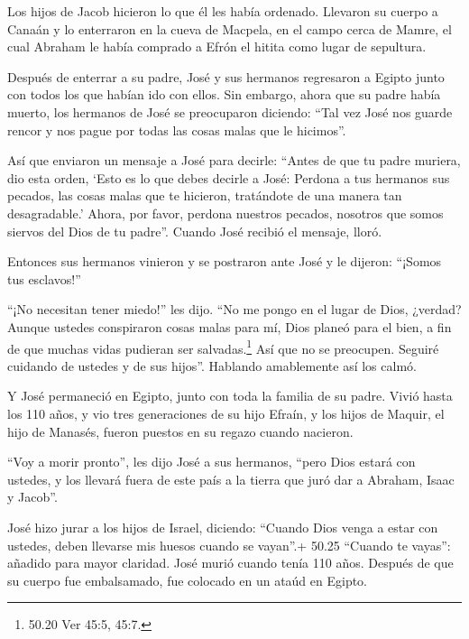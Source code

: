  Los hijos de Jacob hicieron lo que él les había ordenado.
 Llevaron su cuerpo a Canaán y lo enterraron en la cueva de
Macpela, en el campo cerca de Mamre, el cual Abraham le había comprado a
Efrón el hitita como lugar de sepultura.

 Después de enterrar a su padre, José y sus hermanos
regresaron a Egipto junto con todos los que habían ido con ellos.
 Sin embargo, ahora que su padre había muerto, los hermanos
de José se preocuparon diciendo: ``Tal vez José nos guarde rencor y nos
pague por todas las cosas malas que le hicimos''.

 Así que enviaron un mensaje a José para decirle: ``Antes
de que tu padre muriera, dio esta orden,  `Esto es lo que
debes decirle a José: Perdona a tus hermanos sus pecados, las cosas
malas que te hicieron, tratándote de una manera tan desagradable.'
Ahora, por favor, perdona nuestros pecados, nosotros que somos siervos
del Dios de tu padre''. Cuando José recibió el mensaje, lloró.

 Entonces sus hermanos vinieron y se postraron ante José y
le dijeron: ``¡Somos tus esclavos!''

 ``¡No necesitan tener miedo!'' les dijo. ``No me pongo en
el lugar de Dios, ¿verdad?  Aunque ustedes conspiraron
cosas malas para mí, Dios planeó para el bien, a fin de que muchas vidas
pudieran ser salvadas.\footnote{50.20 Ver 45:5, 45:7.}  Así
que no se preocupen. Seguiré cuidando de ustedes y de sus hijos''.
Hablando amablemente así los calmó.

 Y José permaneció en Egipto, junto con toda la familia de
su padre. Vivió hasta los 110 años,  y vio tres
generaciones de su hijo Efraín, y los hijos de Maquir, el hijo de
Manasés, fueron puestos en su regazo cuando nacieron.

 ``Voy a morir pronto'', les dijo José a sus hermanos,
``pero Dios estará con ustedes, y los llevará fuera de este país a la
tierra que juró dar a Abraham, Isaac y Jacob''.

 José hizo jurar a los hijos de Israel, diciendo: ``Cuando
Dios venga a estar con ustedes, deben llevarse mis huesos cuando se
vayan''.+ 50.25 ``Cuando te vayas'': añadido para mayor claridad.
 José murió cuando tenía 110 años. Después de que su cuerpo
fue embalsamado, fue colocado en un ataúd en Egipto.
